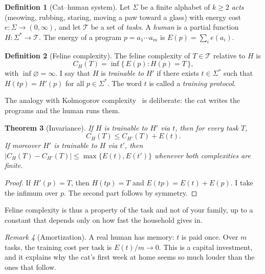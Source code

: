 \documentclass[11pt,a4paper]{article}
\theoremstyle{plain}
\newtheorem{teorema}{Theorem}[section]
\theoremstyle{definition}
\newtheorem{definicion}[teorema]{Definition}
\theoremstyle{remark}
\newtheorem{observacion}[teorema]{Remark}
\numberwithin{equation}{section}
\newcommand{\cg}{C}
\begin{document}
\begin{definicion}[Cat--human system]\label{def:sistema}
Let $\Sigma$ be a finite alphabet of $k\ge 2$ \emph{acts} (meowing, rubbing, staring, moving a paw toward a glass) with energy cost $e:\Sigma\to(0,\infty)$, and let $\mathcal T$ be a set of \emph{tasks}. A \emph{human} is a partial function $H:\Sigma^*\to\mathcal T$. The energy of a program $p=a_1\cdots a_m$ is $E(p)=\sum_i e(a_i)$.
\end{definicion}

\begin{definicion}[Feline complexity]
The feline complexity of $T\in\mathcal T$ relative to $H$ is
\begin{equation}
  \cg_H(T)=\inf\{\,E(p) : H(p)=T\,\},
\end{equation}
with $\inf\varnothing=\infty$. I say that $H$ is \emph{trainable to} $H'$ if there exists $t\in\Sigma^*$ such that $H(tp)=H'(p)$ for all $p\in\Sigma^*$. The word $t$ is called a \emph{training protocol}.
\end{definicion}

The analogy with Kolmogorov complexity~\cite{kolmogorov,livitanyi} is deliberate: the cat writes the programs and the human runs them.

\begin{teorema}[Invariance]\label{teo:invariancia}
If $H$ is trainable to $H'$ via $t$, then for every task $T$,
\begin{equation}
  \cg_H(T)\le \cg_{H'}(T)+E(t).
\end{equation}
If moreover $H'$ is trainable to $H$ via $t'$, then $|\cg_H(T)-\cg_{H'}(T)|\le\max\{E(t),E(t')\}$ whenever both complexities are finite.
\end{teorema}

\begin{proof}
If $H'(p)=T$, then $H(tp)=T$ and $E(tp)=E(t)+E(p)$. I take the infimum over $p$. The second part follows by symmetry.
\end{proof}

Feline complexity is thus a property of the task and not of your family, up to a constant that depends only on how fast the household gives in.

\begin{observacion}[Amortization]
A real human has memory: $t$ is paid once. Over $m$ tasks, the training cost per task is $E(t)/m\to 0$. This is a capital investment, and it explains why the cat's first week at home seems so much louder than the ones that follow.
\end{observacion}
\end{document}

